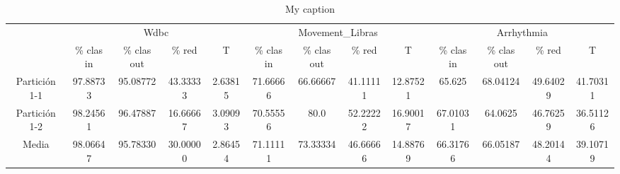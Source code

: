 \begin{table}[]
\centering
\caption{My caption}
\label{my-label}
\begin{tabular}{c|c|c|c|c|c|c|c|c|c|c|c|c|}
\cline{2-13}
                                    & \multicolumn{4}{c|}{Wdbc}             & \multicolumn{4}{c|}{Movement\_Libras} & \multicolumn{4}{c|}{Arrhythmia}       \\ \cline{2-13}
                                    & \% clas in & \% clas out & \% red & T & \% clas in & \% clas out & \% red & T & \% clas in & \% clas out & \% red & T \\ \hline
\multicolumn{1}{|c|}{ Partición 1-1 } &  97.88733    & 95.08772  & 43.33333  & 2.63815 & 71.66666 & 66.66667  & 41.11111  & 12.87521 & 65.625 & 68.04124 & 49.64029 & 41.70311  \\ \hline
\multicolumn{1}{|c|}{ Partición 1-2 } &  98.24561    & 96.47887  & 16.66667  & 3.09093 & 70.55556 & 80.0  & 52.22222  & 16.90017 & 67.01031 & 64.0625 & 46.76259 & 36.51126  \\ \hline
\multicolumn{1}{|c|}{ Media } &  98.06647    & 95.78330  & 30.00000  & 2.86454 & 71.11111 & 73.33334  & 46.66666  & 14.88769 & 66.31766 & 66.05187 & 48.20144 & 39.10719  \\ \hline
\end{tabular}
\end{table}
